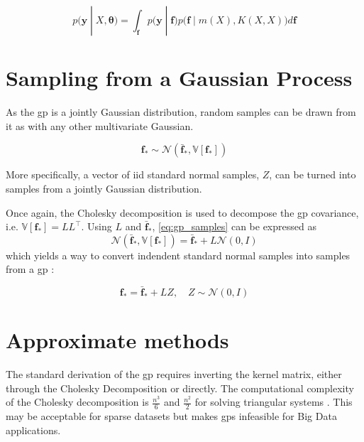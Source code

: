 \begin{equation}
    p(\boldsymbol{y} \; | \; X, \boldsymbol{\theta}) = \int_{\boldsymbol{f}} p\big(\boldsymbol{y} \;| \; \boldsymbol{f}\big) p\big(\boldsymbol{f} \; |\; m(X), K(X, X)\big) d\boldsymbol{f}
\end{equation}

\section{Sampling from a Gaussian Process}\label{sec:gp_samples}
As the \acrshort{gp} is a jointly Gaussian distribution, random samples can be drawn from it as with any other multivariate Gaussian.

\begin{equation}\label{eq:gp_samples}
    \boldsymbol{f}_* \sim \mathcal{N}(\bar{\boldsymbol{f}}_*, \mathbb{V}[\boldsymbol{f}_*])
\end{equation}

More specifically, a vector of \acrshort{iid} standard normal samples, $Z$, can be turned into samples from a jointly Gaussian distribution.

Once again, the Cholesky decomposition is used to decompose the \acrshort{gp} covariance, i.e. $\mathbb{V}[\boldsymbol{f}_*] = L L^\intercal$. Using $L$ and $\bar{\boldsymbol{f}}_*$, \cref{eq:gp_samples} can be expressed as 
\begin{equation}
    \mathcal{N}(\bar{\boldsymbol{f}}_*, \mathbb{V}[\boldsymbol{f}_*]) = \bar{\boldsymbol{f}}_* + L \mathcal{N}(0, I)
\end{equation}
which yields a way to convert indendent standard normal samples into samples from a \acrshort{gp} \cite{rasmussen}:

\begin{equation}
    \boldsymbol{f}_* = \bar{\boldsymbol{f}}_* + L Z, \quad Z \sim \mathcal{N}(0, I)
\end{equation}

\section{Approximate methods}
The standard derivation of the \acrshort{gp} requires inverting the kernel matrix, either through the Cholesky Decomposition or directly. The computational complexity of the Cholesky decomposition is $\frac{n^3}{6}$ and $\frac{n^2}{2}$ for solving triangular systems \cite{rasmussen}. This may be acceptable for sparse datasets but makes \acrshort{gp}s infeasible for Big Data applications. 

